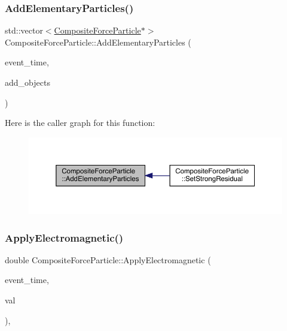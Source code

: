 \subsubsection{\texorpdfstring{Add\+Elementary\+Particles()}{AddElementaryParticles()}}
{\footnotesize\ttfamily std\+::vector$<$\hyperlink{class_composite_force_particle}{Composite\+Force\+Particle}$\ast$$>$ Composite\+Force\+Particle\+::\+Add\+Elementary\+Particles (\begin{DoxyParamCaption}\item[{std\+::chrono\+::time\+\_\+point$<$ \hyperlink{universe_8h_a0ef8d951d1ca5ab3cfaf7ab4c7a6fd80}{Clock} $>$}]{event\+\_\+time,  }\item[{std\+::vector$<$ \hyperlink{class_composite_force_particle}{Composite\+Force\+Particle} $\ast$$>$}]{add\+\_\+objects }\end{DoxyParamCaption})}

Here is the caller graph for this function\+:\nopagebreak
\begin{figure}[H]
\begin{center}
\leavevmode
\includegraphics[width=350pt]{class_composite_force_particle_a2b88f000067b5d430d1850e75b733f56_icgraph}
\end{center}
\end{figure}
\mbox{\label{class_composite_force_particle_afa4dc18258722b3c85fbc9789a4297a5}} 
\subsubsection{\texorpdfstring{Apply\+Electromagnetic()}{ApplyElectromagnetic()}}
{\footnotesize\ttfamily double Composite\+Force\+Particle\+::\+Apply\+Electromagnetic (\begin{DoxyParamCaption}\item[{std\+::chrono\+::time\+\_\+point$<$ \hyperlink{universe_8h_a0ef8d951d1ca5ab3cfaf7ab4c7a6fd80}{Clock} $>$}]{event\+\_\+time,  }\item[{double}]{val }\end{DoxyParamCaption})\hspace{0.3cm}{\ttfamily [inline]}, {\ttfamily [virtual]}}



